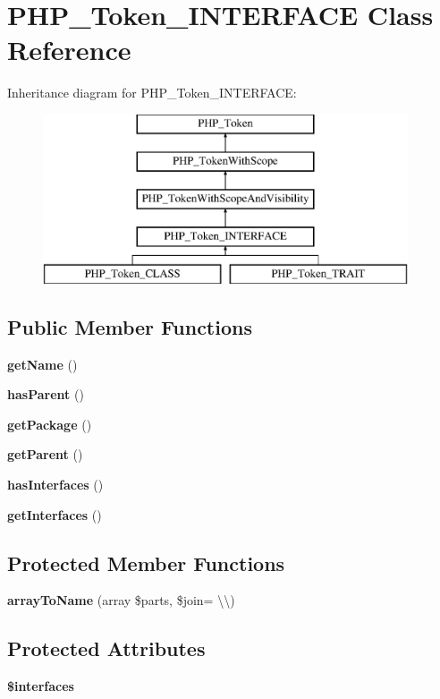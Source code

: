 \section{P\+H\+P\+\_\+\+Token\+\_\+\+I\+N\+T\+E\+R\+F\+A\+C\+E Class Reference}
\label{class_p_h_p___token___i_n_t_e_r_f_a_c_e}
Inheritance diagram for P\+H\+P\+\_\+\+Token\+\_\+\+I\+N\+T\+E\+R\+F\+A\+C\+E\+:\begin{figure}[H]
\begin{center}
\leavevmode
\includegraphics[height=5.000000cm]{class_p_h_p___token___i_n_t_e_r_f_a_c_e}
\end{center}
\end{figure}
\subsection*{Public Member Functions}
\begin{DoxyCompactItemize}
\item 
{\bf get\+Name} ()
\item 
{\bf has\+Parent} ()
\item 
{\bf get\+Package} ()
\item 
{\bf get\+Parent} ()
\item 
{\bf has\+Interfaces} ()
\item 
{\bf get\+Interfaces} ()
\end{DoxyCompactItemize}
\subsection*{Protected Member Functions}
\begin{DoxyCompactItemize}
\item 
{\bf array\+To\+Name} (array \$parts, \$join= \textquotesingle{}\textbackslash{}\textbackslash{}\textquotesingle{})
\end{DoxyCompactItemize}
\subsection*{Protected Attributes}
\begin{DoxyCompactItemize}
\item 
{\bf \$interfaces}
\end{DoxyCompactItemize}


